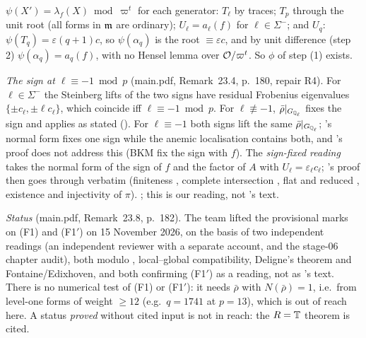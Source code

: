 \begin{outline}
\begin{enumerate}[label=(\arabic*)]
  $\psi(X')=\lambda_f(X)\bmod\varpi^t$ for each generator: $T_\ell$ by traces; $T_p$ through the unit root (all forms in $\mathfrak{m}$ are ordinary);
  $U_\ell=a_\ell(f)$ for $\ell\in\Sigma^-$; and $U_q$: $\psi(T_q)=\varepsilon(q+1)c$, so $\psi(\alpha_q)$ is the root $\equiv\varepsilon c$, and by
  unit difference (step 2) $\psi(\alpha_q)=a_q(f)$, with no Hensel lemma over $\mathcal{O}/\varpi^t$. So $\phi$ of step (1) exists. \stpmc
\end{enumerate}
\emph{The sign at $\ell\equiv-1\bmod p$} (main.pdf, Remark~23.4, p.~180, repair R4). For $\ell\in\Sigma^-$ the Steinberg lifts of the two
signs have residual Frobenius eigenvalues $\{\pm c_\ell,\pm\ell c_\ell\}$, which coincide iff $\ell\equiv-1\bmod p$. For $\ell\not\equiv-1$,
$\bar\rho|_{G_{\mathbb{Q}_\ell}}$ fixes the sign and \cite[Thm~3.14]{KO} applies as stated (\stcited). For $\ell\equiv-1$ both signs lift the same
$\bar\rho|_{G_{\mathbb{Q}_\ell}}$; \cite{KO}'s normal form fixes one sign while the anemic localisation contains both, and \cite{KO}'s proof does not
address this (BKM \cite[\S4.2, \S5]{BKM} fix the sign with $f$). The \emph{sign-fixed reading} takes the normal form of the sign of $f$ and
the factor of $A$ with $U_\ell=\varepsilon_\ell c_\ell$; \cite{KO}'s proof then goes through verbatim (finiteness \cite[Thm~2.9]{KO}, complete
intersection \cite[Lemma~3.8, Cor.~3.13]{KO}, flat and reduced \cite[Lemmas~3.15, 3.16]{KO}, existence and injectivity of $\pi$). \stpmc;
this is our reading, not \cite{KO}'s text.

\emph{Status} (main.pdf, Remark~23.8, p.~182). The team lifted the provisional marks on (F1) and (F1$'$) on 15 November 2026, on the basis
of two independent readings (an independent reviewer with a separate account, and the stage-06 chapter audit), both modulo
\cite[Thm~3.14]{KO}, local--global compatibility, Deligne's theorem and Fontaine/Edixhoven, and both confirming (F1$'$) as a reading,
not as \cite{KO}'s text. There is no numerical test of (F1) or (F1$'$): it needs $\bar\rho$ with $N(\bar\rho)=1$, i.e.\ from level-one forms
of weight $\ge12$ (e.g.\ $q=1741$ at $p=13$), which is out of reach here. A status \emph{proved} without cited input is not in reach:
the $R=\mathbb{T}$ theorem is cited.


\end{outline}

